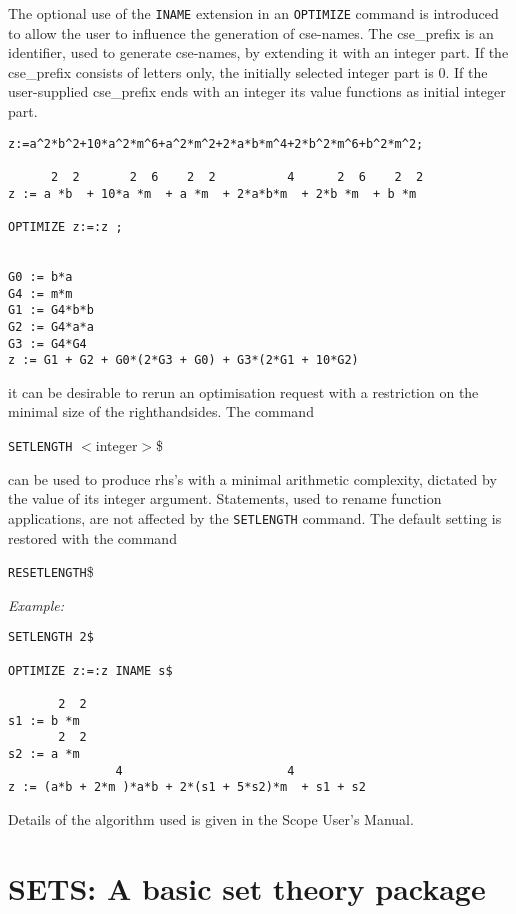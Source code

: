 \documentclass[11pt,letterpaper]{book}
\begin{document}
The optional use of the {\tt INAME} extension in an {\tt OPTIMIZE}
command is introduced to allow the user to influence the generation of
cse-names.  The cse\_prefix is an identifier, used to generate
cse-names, by extending it with an integer part. If the cse\_prefix
consists of letters only, the initially selected integer part is 0.
If the user-supplied cse\_prefix ends with an integer its value
functions as initial integer part.

{\small\begin{verbatim}
z:=a^2*b^2+10*a^2*m^6+a^2*m^2+2*a*b*m^4+2*b^2*m^6+b^2*m^2;

      2  2       2  6    2  2          4      2  6    2  2
z := a *b  + 10*a *m  + a *m  + 2*a*b*m  + 2*b *m  + b *m

OPTIMIZE z:=:z ;


G0 := b*a
G4 := m*m
G1 := G4*b*b
G2 := G4*a*a
G3 := G4*G4
z := G1 + G2 + G0*(2*G3 + G0) + G3*(2*G1 + 10*G2)

\end{verbatim}}
it can be desirable
to rerun an optimisation request with a restriction on the minimal size of
the righthandsides. The command

\hspace*{1cm} {\tt SETLENGTH} $<$integer$>$\$

can be used to produce rhs's with a minimal arithmetic complexity,
dictated by the value of
its integer argument. Statements, used to rename function applications, are
not affected by the {\tt SETLENGTH} command. The default setting is restored
with the command

\hspace*{1cm} {\tt RESETLENGTH}\$

{\em Example:}
{\small\begin{verbatim}
SETLENGTH 2$

OPTIMIZE z:=:z INAME s$

       2  2
s1 := b *m
       2  2
s2 := a *m
               4                       4
z := (a*b + 2*m )*a*b + 2*(s1 + 5*s2)*m  + s1 + s2

\end{verbatim}}

Details of the algorithm used is given in the Scope User's Manual.


\chapter{SETS: A basic set theory package}
\label{SETS}
\end{document}
